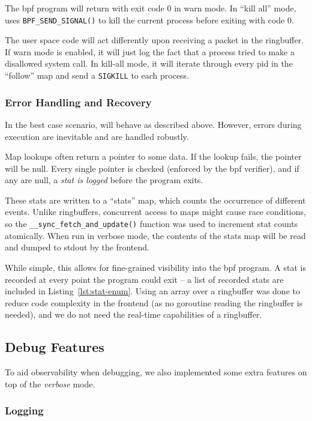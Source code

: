 The \ac{bpf} program will return with exit code 0 in warn mode. In ``kill
all'' mode, \af uses \texttt{BPF\_SEND\_SIGNAL()} to kill the current process
before exiting with code 0.

The user space code will act differently upon receiving a packet in the
ringbuffer. If warn mode is enabled, it will just log the fact that a process
tried to make a disallowed system call. In kill-all mode, it will iterate through
every \ac{pid} in the ``follow'' map and send a \texttt{SIGKILL} to each
process.

\subsubsection{Error Handling and Recovery}\label{subsubsec:err-handling}

In the best case scenario, \af will behave as described above. However, errors
during execution are inevitable and are handled robustly. 

Map lookups often return a pointer to some data. If the lookup fails, the
pointer will be null. Every single pointer is checked (enforced by the \ac{bpf}
verifier), and if any are null, a \textit{stat is logged} before the program
exits.

These stats are written to a ``stats'' map, which counts the occurrence of
different events. Unlike ringbuffers, concurrent access to maps might cause race
conditions, so the \texttt{\_\_sync\_fetch\_and\_update()} function was used to
increment stat counts atomically. When run in verbose mode, the contents of the
stats map will be read and dumped to \ac{stdout} by the frontend.

While simple, this allows for fine-grained visibility into the \ac{bpf} program.
A stat is recorded at every point the program could exit -- a list of recorded
stats are included in Listing~\ref{lst:stat-enum}. Using an array over a
ringbuffer was done to reduce code complexity in the frontend (as no goroutine
reading the ringbuffer is needed), and we do not need the real-time capabilities
of a ringbuffer.

\subsection{Debug Features}

To aid observability when debugging, we also implemented some extra features
on top of the \textit{verbose} mode.

\subsubsection{Logging}

